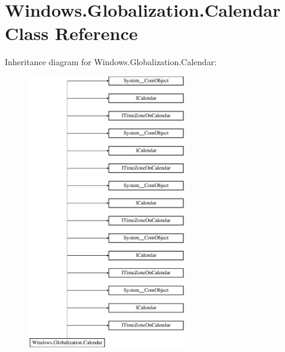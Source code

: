 \hypertarget{class_windows_1_1_globalization_1_1_calendar}{}\section{Windows.\+Globalization.\+Calendar Class Reference}
\label{class_windows_1_1_globalization_1_1_calendar}
Inheritance diagram for Windows.\+Globalization.\+Calendar\+:\begin{figure}[H]
\begin{center}
\leavevmode
\includegraphics[height=12.000000cm]{class_windows_1_1_globalization_1_1_calendar}
\end{center}
\end{figure}
